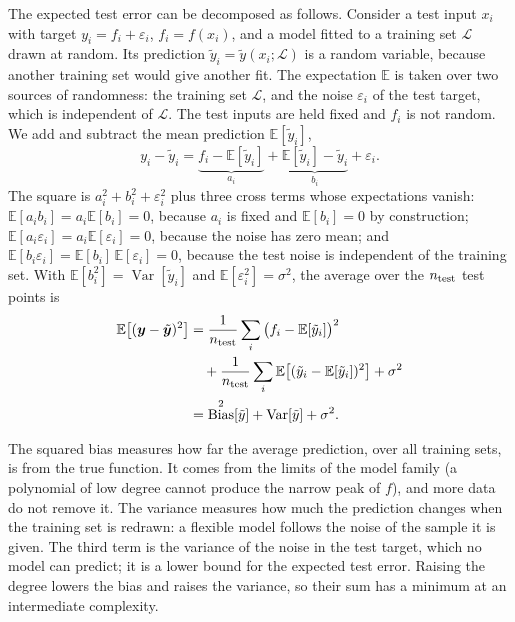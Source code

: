 \documentclass[aps,reprint,amsmath,amssymb,nofootinbib,floatfix]{revtex4-2}
\newcommand{\E}{\mathbb{E}}
\DeclareMathOperator{\Var}{Var}
\DeclareMathOperator{\Bias}{Bias}
\begin{document}
The expected test error can be decomposed as follows. Consider a test input $x_i$ with target
$y_i=f_i+\varepsilon_i$, $f_i=f(x_i)$, and a model fitted to a training set $\mathcal L$ drawn at
random. Its prediction $\tilde y_i=\tilde y(x_i;\mathcal L)$ is a random variable, because another
training set would give another fit. The expectation $\E$ is taken over two sources of randomness:
the training set $\mathcal L$, and the noise $\varepsilon_i$ of the test target, which is
independent of $\mathcal L$. The test inputs are held fixed and $f_i$ is not random. We add and
subtract the mean prediction $\E[\tilde y_i]$,
\begin{equation}
  y_i-\tilde y_i=\underbrace{f_i-\E[\tilde y_i]}_{a_i}
  +\underbrace{\E[\tilde y_i]-\tilde y_i}_{b_i}+\varepsilon_i .
\end{equation}
The square is $a_i^2+b_i^2+\varepsilon_i^2$ plus three cross terms whose expectations vanish:
$\E[a_ib_i]=a_i\E[b_i]=0$, because $a_i$ is fixed and $\E[b_i]=0$ by construction;
$\E[a_i\varepsilon_i]=a_i\E[\varepsilon_i]=0$, because the noise has zero mean; and
$\E[b_i\varepsilon_i]=\E[b_i]\,\E[\varepsilon_i]=0$, because the test noise is independent of the
training set. With $\E[b_i^2]=\Var[\tilde y_i]$ and $\E[\varepsilon_i^2]=\sigma^2$, the average
over the $n_{\rm test}$ test points is
\begin{align}
  \E\big[(\bm y-\tilde{\bm y})^2\big]
  &=\frac{1}{n_{\rm test}}\sum_i\big(f_i-\E[\tilde y_i]\big)^2 \nonumber\\
  &\quad+\frac{1}{n_{\rm test}}\sum_i\E\big[(\tilde y_i-\E[\tilde y_i])^2\big]+\sigma^2 \nonumber\\
  &=\Bias^2[\tilde y]+\Var[\tilde y]+\sigma^2 .
  \label{eq:biasvar}
\end{align}

The squared bias measures how far the average prediction, over all training sets, is from the true
function. It comes from the limits of the model family (a polynomial of low degree cannot produce
the narrow peak of $f$), and more data do not remove it. The variance measures how much the
prediction changes when the training set is redrawn: a flexible model follows the noise of the
sample it is given. The third term is the variance of the noise in the test target, which no model
can predict; it is a lower bound for the expected test error. Raising the degree lowers the bias
and raises the variance, so their sum has a minimum at an intermediate complexity.
\end{document}
